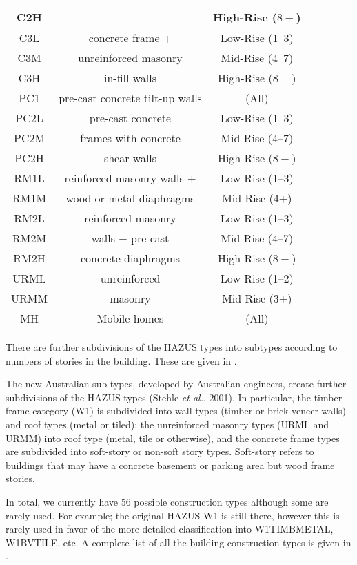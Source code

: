 \begin{table}
\begin{tabular}{|c|c|c|}
C2H & & High-Rise ($8+$)\\
\hline
C3L & concrete frame + & Low-Rise (1--3)\\
C3M & unreinforced masonry & Mid-Rise (4--7)\\
C3H & in-fill walls & High-Rise ($8+$)\\
\hline
PC1 & pre-cast concrete tilt-up walls & (All)\\
\hline
PC2L & pre-cast concrete  & Low-Rise (1--3)\\
PC2M &  frames with concrete  & Mid-Rise (4--7)\\
PC2H & shear walls & High-Rise ($8+$)\\
\hline
RM1L & reinforced masonry walls + & Low-Rise (1--3)\\
RM1M & wood or metal diaphragms  & Mid-Rise (4+)\\
\hline
RM2L & reinforced masonry & Low-Rise (1--3)\\
RM2M & walls + pre-cast & Mid-Rise (4--7)\\
RM2H & concrete diaphragms & High-Rise ($8+$)\\
\hline
URML & unreinforced & Low-Rise (1--2)\\
URMM & masonry & Mid-Rise (3+)\\
\hline
MH & Mobile homes & (All)\\
  \hline
\end{tabular}
\end{table}
There are further subdivisions of the HAZUS types into subtypes
according to numbers of stories in the building. These are given
in .

The new Australian sub-types, developed by Australian engineers,
create further subdivisions of the HAZUS types
(Stehle \textit{et al.}, 2001). %
In particular, the timber frame category
(W1) is subdivided into wall types (timber or brick veneer walls)
and roof types (metal or tiled); the unreinforced masonry types
(URML and URMM) into roof type (metal, tile or  otherwise), and
the concrete frame types are subdivided into soft-story or
non-soft story types. Soft-story refers to buildings that may have
a concrete basement or parking area but wood frame stories.

In total, we currently have 56 possible construction types
although some are rarely used. For example; the original HAZUS W1
is still there, however this is rarely used in favor of the more
detailed classification into W1TIMBMETAL, W1BVTILE, etc. A
complete list of all the building construction types is given in
.

